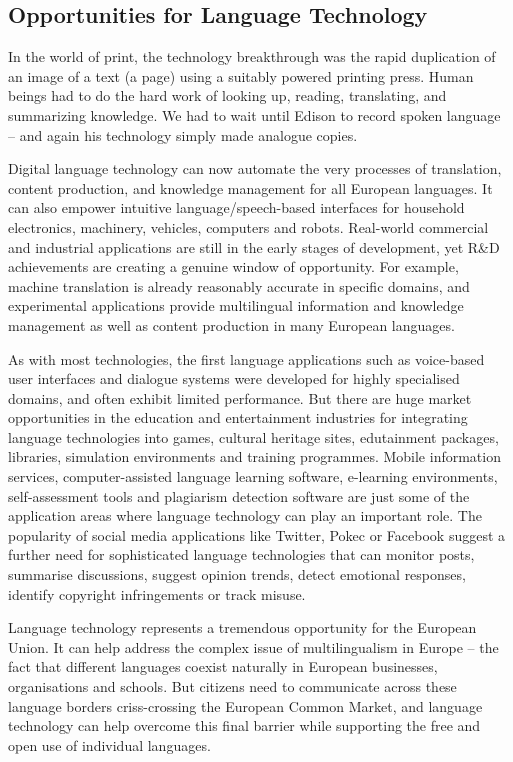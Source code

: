 \begin{multicols}{2}
\subsection{Opportunities for Language Technology}
In the world of print, the technology breakthrough was the rapid
duplication of an image of a text (a page) using a suitably powered
printing press. Human beings had to do the hard work of looking up,
reading, translating, and summarizing knowledge. We had to wait until
Edison to record spoken language – and again his technology simply
made analogue copies.

Digital language technology can now automate the very processes of translation, content production, and knowledge management for all European languages. It can also empower intuitive language/speech-based interfaces for household electronics, machinery, vehicles, computers and robots. Real-world commercial and industrial applications are still in the early stages of development, yet R\&D achievements are creating a genuine window of opportunity. For example, machine translation is already reasonably accurate in specific domains, and experimental applications provide multilingual information and knowledge management as well as content production in many European languages. 

As with most technologies, the first language applications such as voice-based user interfaces and dialogue systems were developed for highly specialised domains, and often exhibit limited performance. But there are huge market opportunities in the education and entertainment industries for integrating language technologies into games, cultural heritage sites, edutainment packages, libraries, simulation environments and training programmes. Mobile information services, computer-assisted language learning software, e-learning environments, self-assessment tools and plagiarism detection software are just some of the application areas where language technology can play an important role. The popularity of social media applications like Twitter, Pokec or Facebook suggest a further need for sophisticated language technologies that can monitor posts, summarise discussions, suggest opinion trends, detect emotional responses, 
identify copyright infringements or track misuse.


Language technology represents a tremendous opportunity for the European Union. It can help address the complex issue of multilingualism in Europe – the fact that different languages coexist naturally in European businesses, organisations and schools. But citizens need to communicate across these language borders criss-crossing the European Common Market, and language technology can help overcome this final barrier while supporting the free and open use of individual languages.


\end{multicols}
